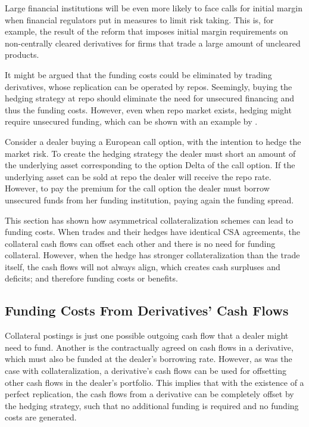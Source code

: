 \documentclass[main.tex]{subfiles}
\begin{document}
        Large financial institutions will be even more likely to face calls for initial margin
        when financial regulators put in measures to limit risk taking.
        This is, for example, the result of the reform \textcite{BCBC2020}
        that imposes initial margin requirements on non-centrally cleared derivatives for 
        firms that trade a large amount of uncleared products.

        It might be argued that the funding costs could be eliminated by trading derivatives,
        whose replication can be operated by repos. 
        Seemingly, buying the hedging strategy at repo should eliminate the need for unsecured financing
        and thus the funding costs. 
        However, even when repo market exists, hedging might require unsecured funding,
        which can be shown with an example by \textcite{Castagna2012FVA}.

        \begin{example}
        Consider a dealer buying a European call option, with the intention to hedge the market risk.
        To create the hedging strategy the dealer must short an amount of the underlying asset corresponding to the option Delta of the call option.
        If the underlying asset can be sold at repo the dealer will receive the repo rate.
        However, to pay the premium for the call option the dealer must borrow unsecured funds from her funding institution,
        paying again the funding spread. 
        \end{example}

        This section has shown how asymmetrical collateralization schemes
        can lead to funding costs. 
        When trades and their hedges have identical CSA agreements, 
        the collateral cash flows can offset each other and there is no need for funding collateral.
        However, when the hedge has stronger collateralization than the trade itself,
        the cash flows will not always align, which creates cash surpluses and deficits;
        and therefore funding costs or benefits.
        
    \subsection{Funding Costs From Derivatives' Cash Flows}
        Collateral postings is just one possible outgoing cash flow that a dealer might need to fund.
        Another is the contractually agreed on cash flows in a derivative,
        which must also be funded at the dealer's borrowing rate.
        However, as was the case with collateralization,
        a derivative's cash flows can be used for offsetting 
        other cash flows in the dealer's portfolio.
        This implies that with the existence of a perfect replication,
        the cash flows from a derivative can be completely offset by the hedging strategy,
        such that no additional funding is required and no funding costs are generated.
\end{document}
